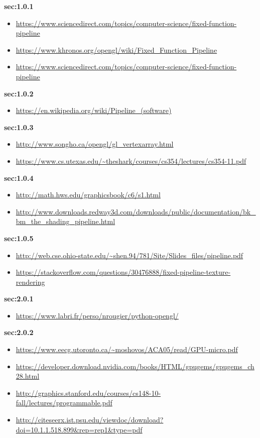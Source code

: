 \documentclass[onecolumn]{article}
\begin{document}
\textbf{sec:1.0.1}
\begin{itemize}
\item  \url{https://www.sciencedirect.com/topics/computer-science/fixed-function-pipeline}
\item \url{https://www.khronos.org/opengl/wiki/Fixed_Function_Pipeline}  
\item \url{https://www.sciencedirect.com/topics/computer-science/fixed-function-pipeline} 
\end{itemize}

\textbf{sec:1.0.2}

\begin{itemize}
\item \url{https://en.wikipedia.org/wiki/Pipeline_(software)} 
\end{itemize}

\textbf{sec:1.0.3}
\begin{itemize}
\item \url{http://www.songho.ca/opengl/gl_vertexarray.html} 
\item \url{https://www.cs.utexas.edu/~theshark/courses/cs354/lectures/cs354-11.pdf} 
\end{itemize}

\textbf{sec:1.0.4}
\begin{itemize}
\item \url{http://math.hws.edu/graphicsbook/c6/s1.html}
\item \url{http://www.downloads.redway3d.com/downloads/public/documentation/bk_bm_the_shading_pipeline.html}
\end{itemize}

\textbf{sec:1.0.5}
\begin{itemize}
\item \url{http://web.cse.ohio-state.edu/~shen.94/781/Site/Slides_files/pipeline.pdf}
\item \url{https://stackoverflow.com/questions/30476888/fixed-pipeline-texture-rendering}
\end{itemize}

\textbf{sec:2.0.1}
\begin{itemize}
\item \url{https://www.labri.fr/perso/nrougier/python-opengl/}
\end{itemize}

\textbf{sec:2.0.2}
\begin{itemize}
\item \url{https://www.eecg.utoronto.ca/~moshovos/ACA05/read/GPU-micro.pdf}
\item \url{https://developer.download.nvidia.com/books/HTML/gpugems/gpugems_ch28.html}
\item \url{http://graphics.stanford.edu/courses/cs148-10-fall/lectures/programmable.pdf}
\item \url{http://citeseerx.ist.psu.edu/viewdoc/download?doi=10.1.1.518.899&rep=rep1&type=pdf}
\end{itemize}
\end{document}
